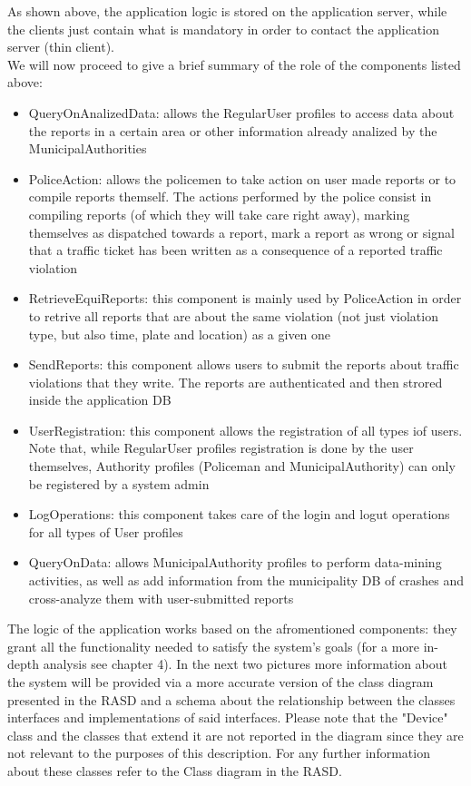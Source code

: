 As shown above, the application logic is stored on the application server, while the clients just contain what is mandatory in order to contact the application server (thin client).\\
We will now proceed to give a brief summary of the role of the components listed above:
\begin{itemize}
\item QueryOnAnalizedData: allows the RegularUser profiles to access data about the reports in a certain area or other information already analized by the MunicipalAuthorities
\item PoliceAction: allows the policemen to take action on user made reports or to compile reports themself. The actions performed by the police consist in compiling reports (of which they will take care right away), marking themselves as dispatched towards a report, mark a report as wrong or signal that a traffic ticket has been written as a consequence of a reported traffic violation
\item RetrieveEquiReports: this component is mainly used by PoliceAction in order to retrive all reports that are about the same violation (not just violation type, but also time, plate and location) as a given one
\item SendReports: this component allows users to submit the reports about traffic violations that they write. The reports are authenticated and then strored inside the application DB
\item UserRegistration: this component allows the registration of all types iof users. Note that, while RegularUser profiles registration is done by the user themselves, Authority profiles (Policeman and MunicipalAuthority) can only be registered by a system admin
\item LogOperations: this component takes care of the login and logut operations for all types of User profiles
\item QueryOnData: allows MunicipalAuthority profiles to perform data-mining activities,  as well as add information from the municipality DB of crashes and cross-analyze them with user-submitted reports
\end{itemize}
The logic of the application works based on the afromentioned components: they grant all the functionality needed to satisfy the system's goals (for a more in-depth analysis see chapter 4).
In the next two pictures more information about the system will be provided via a more accurate version of the class diagram presented in the RASD and a schema about the relationship between the classes interfaces and implementations of said interfaces. Please note that the "Device" class and the classes that extend it are not reported in the diagram since they are not relevant to the purposes of this description. For any further information about these classes refer to the Class diagram in the RASD.

